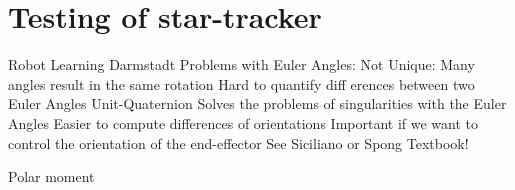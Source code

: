 \documentclass[12pt,a4paper,oneside]{article}
\begin{document}
\newpage
\section{Testing of star-tracker}
\newpage






\newpage

\listoftables

\newpage

\listoffigures

\newpage


Robot Learning Darmstadt
Problems with Euler Angles:
Not Unique: Many angles result in the same rotation
Hard to quantify diff erences between two Euler Angles
Unit-Quaternion
Solves the problems of singularities with the Euler Angles
Easier to compute differences of orientations
Important if we want to control the orientation of the end-effector
See Siciliano or Spong Textbook!


Polar moment
\end{document}
